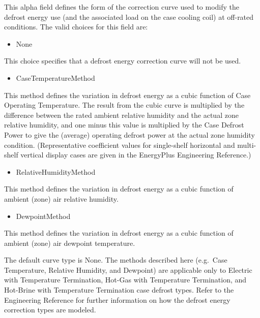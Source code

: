 This alpha field defines the form of the correction curve used to modify the defrost energy use (and the associated load on the case cooling coil) at off-rated conditions. The valid choices for this field are:

\begin{itemize}
\tightlist
\item
  None
\end{itemize}

This choice specifies that a defrost energy correction curve will not be used.

\begin{itemize}
\tightlist
\item
  CaseTemperatureMethod
\end{itemize}

This method defines the variation in defrost energy as a cubic function of Case Operating Temperature. The result from the cubic curve is multiplied by the difference between the rated ambient relative humidity and the actual zone relative humidity, and one minus this value is multiplied by the Case Defrost Power to give the (average) operating defrost power at the actual zone humidity condition. (Representative coefficient values for single-shelf horizontal and multi-shelf vertical display cases are given in the EnergyPlus Engineering Reference.)

\begin{itemize}
\tightlist
\item
  RelativeHumidityMethod
\end{itemize}

This method defines the variation in defrost energy as a cubic function of ambient (zone) air relative humidity.

\begin{itemize}
\tightlist
\item
  DewpointMethod
\end{itemize}

This method defines the variation in defrost energy as a cubic function of ambient (zone) air dewpoint temperature.

The default curve type is None. The methods described here (e.g.~Case Temperature, Relative Humidity, and Dewpoint) are applicable only to Electric with Temperature Termination, Hot-Gas with Temperature Termination, and Hot-Brine with Temperature Termination case defrost types. Refer to the Engineering Reference for further information on how the defrost energy correction types are modeled.

